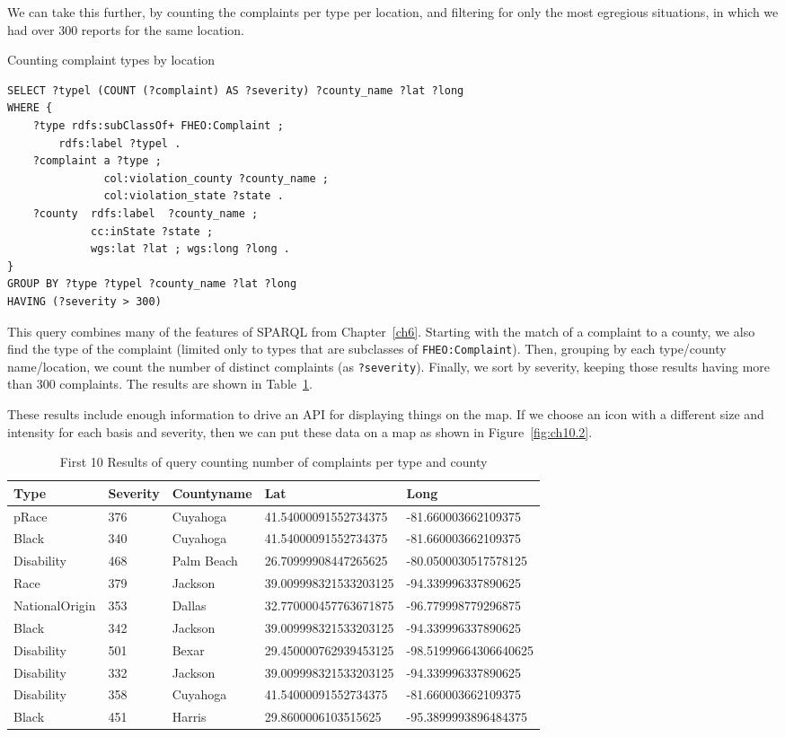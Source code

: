 We can take this further, by counting the complaints per type per location, 
and filtering for only the most egregious situations, in which we had 
over 300 reports for the same location.  

\begin{query}Counting complaint types by location\end{query}
\begin{lstlisting}
SELECT ?typel (COUNT (?complaint) AS ?severity) ?county_name ?lat ?long
WHERE {    
    ?type rdfs:subClassOf+ FHEO:Complaint ;
        rdfs:label ?typel .
    ?complaint a ?type ;
               col:violation_county ?county_name ;
               col:violation_state ?state .
    ?county  rdfs:label  ?county_name ;
             cc:inState ?state ;
             wgs:lat ?lat ; wgs:long ?long .
}
GROUP BY ?type ?typel ?county_name ?lat ?long
HAVING (?severity > 300)
\end{lstlisting}

This query combines many of the features of SPARQL from Chapter~\ref{ch6}.
Starting with the match of a complaint to a county, we also find the
type of the complaint (limited only to types that are subclasses of
\texttt{FHEO:Complaint}). Then, grouping by each type/county name/location, we count the
number of distinct complaints (as \texttt{?severity}). Finally, we sort by
severity, keeping those results having more than 300 complaints. The
results are shown in Table~\ref{tab:ch10.2}.

These results include enough information to drive an API for displaying
things on the map. If we choose an icon with a different size and
intensity for each basis and severity, then we can put these data on a
map as shown in Figure~\ref{fig:ch10.2}.

\begin{table}
\caption{First 10 Results of query counting number of complaints per type and county}
\label{tab:ch10.2}
\begin{tabular}{|lllll|}
\hline
Type&Severity&Countyname&Lat&Long\\
\hline
pRace&376&Cuyahoga&41.54000091552734375&-81.660003662109375\\
Black&340&Cuyahoga&41.54000091552734375&-81.660003662109375\\
Disability&468&Palm Beach&26.70999908447265625&-80.0500030517578125\\
Race&379&Jackson&39.009998321533203125&-94.339996337890625\\
NationalOrigin&353&Dallas&32.770000457763671875&-96.779998779296875\\
Black&342&Jackson&39.009998321533203125&-94.339996337890625\\
Disability&501&Bexar&29.450000762939453125&-98.51999664306640625\\
Disability&332&Jackson&39.009998321533203125&-94.339996337890625\\
Disability&358&Cuyahoga&41.54000091552734375&-81.660003662109375\\
Black&451&Harris&29.8600006103515625&-95.3899993896484375\\
\hline
\end{tabular}
\end{table}


